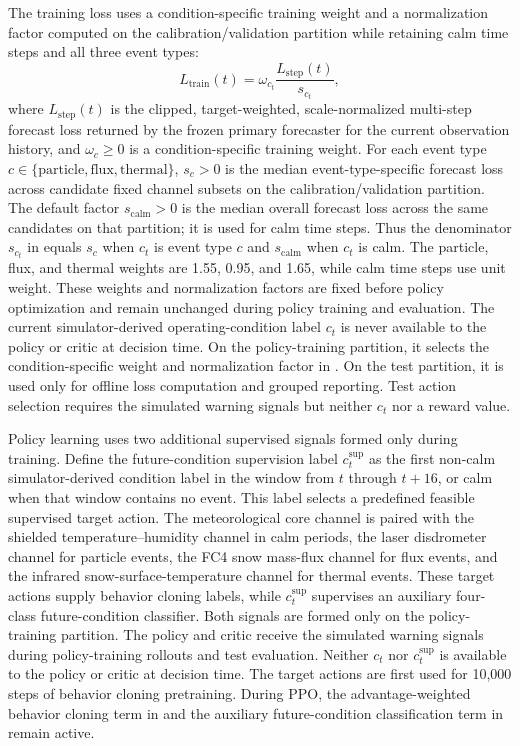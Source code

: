 The training loss uses a condition-specific training weight and a normalization
factor computed on the calibration/validation partition while retaining calm
time steps and all three event types:
\begin{equation}
  L_{\mathrm{train}}(t)
  =
  \omega_{c_t}
  \frac{L_{\mathrm{step}}(t)}{s_{c_t}},
  \label{eq:subtype_normalized_training_loss}
\end{equation}
where $L_{\mathrm{step}}(t)$ is the clipped, target-weighted, scale-normalized
multi-step forecast loss returned by the frozen primary forecaster for the
current observation history, and $\omega_c\geq0$ is a condition-specific
training weight. For each event type
$c\in\{\mathrm{particle},\mathrm{flux},\mathrm{thermal}\}$, $s_c>0$ is the
median event-type-specific forecast loss across candidate fixed channel subsets
on the calibration/validation partition. The default factor $s_{\mathrm{calm}}>0$ is the
median overall forecast loss across the same candidates on that partition; it is
used for calm time steps. Thus the denominator $s_{c_t}$ in
 equals $s_c$ when $c_t$ is event type
$c$ and $s_{\mathrm{calm}}$ when $c_t$ is calm. The particle, flux, and thermal weights are 1.55, 0.95,
and 1.65, while calm time steps use unit weight. These weights and normalization
factors are fixed before policy optimization and remain unchanged during policy
training and evaluation. The current simulator-derived operating-condition label $c_t$ is
never available to the policy or critic at decision time. On the policy-training
partition, it selects the condition-specific weight and normalization factor in
. On the test partition, it is used only
for offline loss computation and grouped reporting. Test action selection requires
the simulated warning signals but neither $c_t$ nor a reward value.

Policy learning uses two additional supervised signals formed only during
training. Define the future-condition supervision label $c_t^{\mathrm{sup}}$ as the
first non-calm simulator-derived condition label in the window from $t$ through
$t+16$, or calm when that window contains no event. This label selects a
predefined feasible supervised target action. The meteorological core channel is paired with the
shielded temperature--humidity channel in calm periods, the laser disdrometer channel for particle
events, the FC4 snow mass-flux channel for flux events, and the infrared
snow-surface-temperature channel for thermal events. These target actions supply
behavior cloning labels, while $c_t^{\mathrm{sup}}$ supervises an auxiliary
four-class future-condition classifier. Both signals are
formed only on the policy-training partition. The policy and critic receive the
simulated warning signals during policy-training rollouts and test evaluation.
Neither $c_t$ nor $c_t^{\mathrm{sup}}$ is available to the policy or critic at
decision time. The target actions are first used for 10,000 steps of
behavior cloning pretraining.
During PPO, the advantage-weighted behavior cloning term in 
and the auxiliary future-condition classification term in
 remain active.

